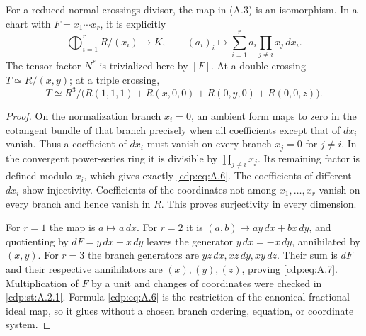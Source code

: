 
\begin{proposition}\label{cdp:st:A.1.2}
For a reduced normal-crossings divisor, the map in (A.3) is an isomorphism. In a chart with $F=x_1\cdots x_r$, it is explicitly
\[
 \bigoplus_{i=1}^r R/(x_i)\longrightarrow K,
 \qquad (a_i)_i\longmapsto
 \sum_{i=1}^r a_i\prod_{j\ne i}x_j\,dx_i.
\tag{A.6}\label{cdp:eq:A.6}
\]
The tensor factor $N^*$ is trivialized here by $[F]$. At a double crossing $T\simeq R/(x,y)$; at a triple crossing,
\[
 T\simeq R^3/\bigl(R(1,1,1)+R(x,0,0)+R(0,y,0)+R(0,0,z)\bigr).
\tag{A.7}\label{cdp:eq:A.7}
\]
\end{proposition}
\begin{proof}
On the normalization branch $x_i=0$, an ambient form maps to zero in the cotangent bundle of that branch precisely when all coefficients except that of $dx_i$ vanish. Thus a coefficient of $dx_i$ must vanish on every branch $x_j=0$ for $j\ne i$. In the convergent power-series ring it is divisible by $\prod_{j\ne i}x_j$. Its remaining factor is defined modulo $x_i$, which gives exactly \eqref{cdp:eq:A.6}. The coefficients of different $dx_i$ show injectivity. Coefficients of the coordinates not among $x_1,\ldots,x_r$ vanish on every branch and hence vanish in $R$. This proves surjectivity in every dimension.

For $r=1$ the map is $a\mapsto a\,dx$. For $r=2$ it is $(a,b)\mapsto ay\,dx+bx\,dy$, and quotienting by $dF=y\,dx+x\,dy$ leaves the generator $y\,dx=-x\,dy$, annihilated by $(x,y)$. For $r=3$ the branch generators are $yz\,dx,xz\,dy,xy\,dz$. Their sum is $dF$ and their respective annihilators are $(x),(y),(z)$, proving \eqref{cdp:eq:A.7}. Multiplication of $F$ by a unit and changes of coordinates were checked in \ref{cdp:st:A.2.1}. Formula \eqref{cdp:eq:A.6} is the restriction of the canonical fractional-ideal map, so it glues without a chosen branch ordering, equation, or coordinate system.
\end{proof}


